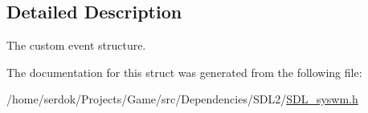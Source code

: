 \subsection{Detailed Description}
The custom event structure. 

The documentation for this struct was generated from the following file\+:\begin{DoxyCompactItemize}
\item 
/home/serdok/\+Projects/\+Game/src/\+Dependencies/\+S\+D\+L2/\hyperlink{SDL__syswm_8h}{S\+D\+L\+\_\+syswm.\+h}\end{DoxyCompactItemize}
